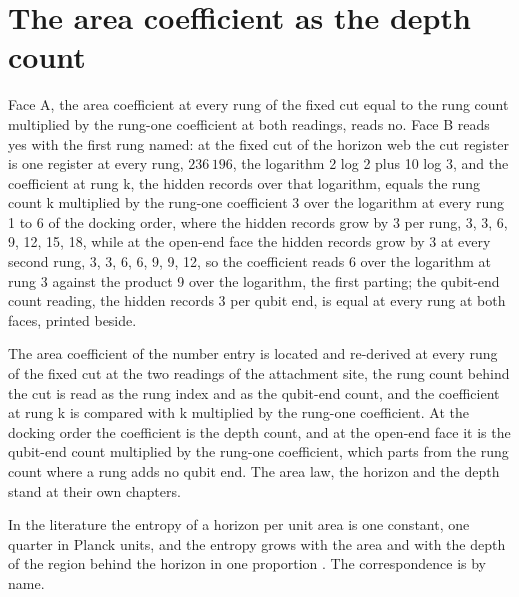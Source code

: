 \section{The area coefficient as the depth count}\label{mod:X-4-D544091-w-ardc}
\begin{chwall}\label{box:X-4-D544091-w-ardc:1}
Face A, the area coefficient at every rung of the fixed cut equal to the rung count multiplied by the rung-one coefficient at both readings, reads no. Face B reads yes with the first rung named: at the fixed cut of the horizon web the cut register is one register at every rung, $236\,196$, the logarithm 2 log 2 plus 10 log 3, and the coefficient at rung k, the hidden records over that logarithm, equals the rung count k multiplied by the rung-one coefficient 3 over the logarithm at every rung 1 to 6 of the docking order, where the hidden records grow by 3 per rung, 3, 3, 6, 9, 12, 15, 18, while at the open-end face the hidden records grow by 3 at every second rung, 3, 3, 6, 6, 9, 9, 12, so the coefficient reads 6 over the logarithm at rung 3 against the product 9 over the logarithm, the first parting; the qubit-end count reading, the hidden records 3 per qubit end, is equal at every rung at both faces, printed beside.
\end{chwall}
The area coefficient of the number entry is located and re-derived at every rung of the fixed cut at the two readings of the attachment site, the rung count behind the cut is read as the rung index and as the qubit-end count, and the coefficient at rung k is compared with k multiplied by the rung-one coefficient. At the docking order the coefficient is the depth count, and at the open-end face it is the qubit-end count multiplied by the rung-one coefficient, which parts from the rung count where a rung adds no qubit end. The area law, the horizon and the depth stand at their own chapters.
\begin{chbridge}
In the literature the entropy of a horizon per unit area is one constant, one quarter in Planck units, and the entropy grows with the area and with the depth of the region behind the horizon in one proportion \cite{Bekenstein1973,Hawking1975,Bousso2002}. The correspondence is by name.
\end{chbridge}
